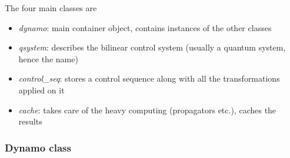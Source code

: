 \documentclass[aps, pra, a4paper, longbibliography, superscriptaddress]{revtex4-1}
\begin{document}
The four main classes are 
\begin{itemize}
\item
\emph{dynamo}: main container object, contains instances of the other classes

\item
\emph{qsystem}: describes the bilinear control system (usually a quantum system, hence the name)

\item
\emph{control\_seq}: stores a control sequence along with all the transformations applied on it

\item
\emph{cache}: takes care of the heavy computing (propagators etc.), caches the results
\end{itemize}

\subsubsection{Dynamo class}
\end{document}
